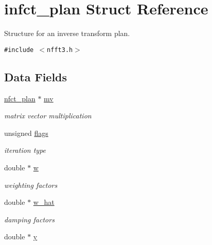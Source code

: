 \hypertarget{structinfct__plan}{
\section{infct\_\-plan Struct Reference}
\label{structinfct__plan}
}
Structure for an inverse transform plan.  


{\tt \#include $<$nfft3.h$>$}

\subsection*{Data Fields}
\begin{CompactItemize}
\item 
\hypertarget{structinfct__plan_o0}{
\hyperlink{structnfct__plan}{nfct\_\-plan} $\ast$ \hyperlink{structinfct__plan_o0}{mv}}
\label{structinfct__plan_o0}

\begin{CompactList}\small\item\em matrix vector multiplication \item\end{CompactList}\item 
\hypertarget{structinfct__plan_o1}{
unsigned \hyperlink{structinfct__plan_o1}{flags}}
\label{structinfct__plan_o1}

\begin{CompactList}\small\item\em iteration type \item\end{CompactList}\item 
\hypertarget{structinfct__plan_o2}{
double $\ast$ \hyperlink{structinfct__plan_o2}{w}}
\label{structinfct__plan_o2}

\begin{CompactList}\small\item\em weighting factors \item\end{CompactList}\item 
\hypertarget{structinfct__plan_o3}{
double $\ast$ \hyperlink{structinfct__plan_o3}{w\_\-hat}}
\label{structinfct__plan_o3}

\begin{CompactList}\small\item\em damping factors \item\end{CompactList}\item 
\hypertarget{structinfct__plan_o4}{
double $\ast$ \hyperlink{structinfct__plan_o4}{y}}
\label{structinfct__plan_o4}


\end{CompactItemize}
